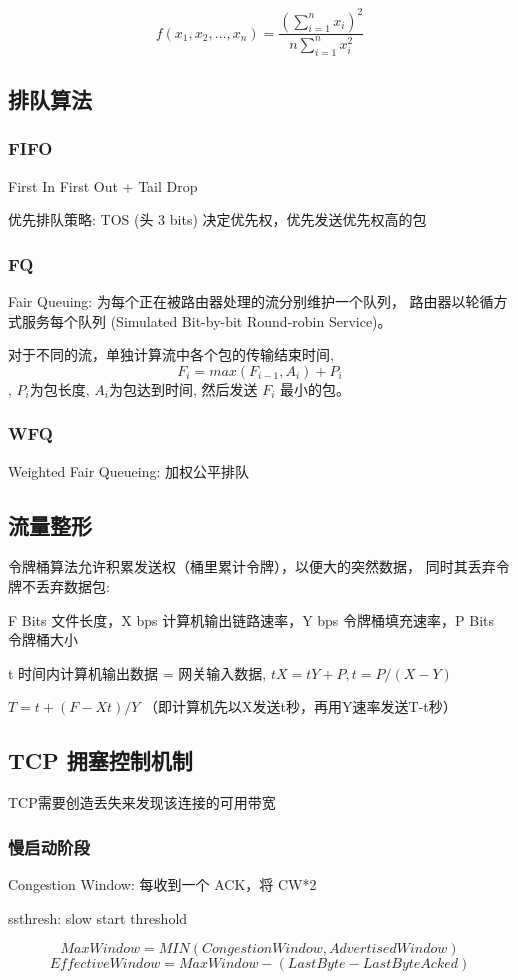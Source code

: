 \documentclass[UTF8,cs4size]{ctexart}
\begin{document}
$$f(x_1, x_2, \dots, x_n) = \frac{(\sum_{i=1}^n x_i)^2}{n \sum_{i=1}^n x_i^2}$$
\subsection{排队算法}
\subsubsection{FIFO}
\begin{compactitem}
  \item First In First Out + Tail Drop
  \item 优先排队策略: TOS (头 3 bits) 决定优先权，优先发送优先权高的包
\end{compactitem}
\subsubsection{FQ}
Fair Queuing: 为每个正在被路由器处理的流分别维护一个队列，
路由器以轮循方式服务每个队列
(Simulated Bit-by-bit Round-robin Service)。

对于不同的流，单独计算流中各个包的传输结束时间,
$$F_i= max(F_{i-1}, A_i)+ P_i$$,
$P_i$为包长度, $A_i$为包达到时间,
然后发送 $F_i$ 最小的包。
\subsubsection{WFQ}
Weighted Fair Queueing: 加权公平排队
\subsection{流量整形}
令牌桶算法允许积累发送权（桶里累计令牌），以便大的突然数据，
同时其丢弃令牌不丢弃数据包:
\begin{compactitem}
  \item F Bits 文件长度，X bps 计算机输出链路速率，Y bps 令牌桶填充速率，P Bits 令牌桶大小
  \item t 时间内计算机输出数据 = 网关输入数据, $tX=tY+P, t=P/(X-Y)$
  \item $T = t+(F-Xt)/Y$ （即计算机先以X发送t秒，再用Y速率发送T-t秒）
\end{compactitem}
\subsection{TCP 拥塞控制机制}
TCP需要创造丢失来发现该连接的可用带宽
\subsubsection{慢启动阶段}
\begin{compactitem}
  \item Congestion Window: 每收到一个 ACK，将 CW*2
  \item ssthresh: slow start threshold
\end{compactitem}
$$MaxWindow = MIN(CongestionWindow, AdvertisedWindow)$$
$$EffectiveWindow = MaxWindow - (LastByte - LastByteAcked)$$
\end{document}
